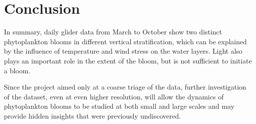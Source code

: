 \documentclass[../Main.tex]{subfiles}
\begin{document}
\section*{\crule[blue]{.3cm}{.3cm} Conclusion}
In summary, daily glider data from March to October show two distinct phytoplankton blooms in different vertical stratification, which can be explained by the influence of temperature and wind stress on the water layers. Light also plays an important role in the extent of the bloom, but is not sufficient to initiate a bloom.

Since the project aimed only at a coarse triage of the data, further investigation of the dataset, even at even higher resolution, will allow the dynamics of phytoplankton blooms to be studied at both small and large scales and may provide hidden insights that were previously undiscovered.
\end{document}
